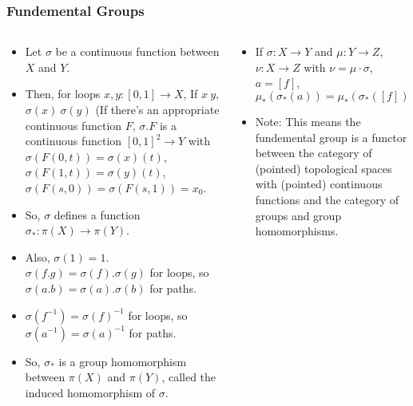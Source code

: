 \documentclass[8pt]{beamer}
\begin{document}
  \begin{frame}
    \frametitle{Fundemental Groups}
    \begin{columns}
      \begin{column}[T]{0.5\textwidth}
        \begin{itemize}
          \item Let $\sigma$ be a continuous function between $X$ and $Y$.
          \item Then, for loops $x,y : [0,1] \rightarrow X$,
            If $x ~ y$, $\sigma(x) ~ \sigma(y)$ (If there's an appropriate
            continuous function $F$, $\sigma . F$ is a continuous function
            $[0,1]^2 \rightarrow Y$ with $\sigma(F(0,t)) = \sigma(x)(t)$,
            $\sigma(F(1,t)) = \sigma(y)(t)$, $\sigma(F(s,0)) = \sigma(F(s,1)) =
            x_0$.
          \item So, $\sigma$ defines a function $\sigma_* : \pi(X) \rightarrow
            \pi(Y)$.
          \item Also, $\sigma(1) = 1$. $\sigma(f.g) = \sigma(f).\sigma(g)$ for
            loops, so $\sigma(a.b) = \sigma(a).\sigma(b)$ for paths.
          \item $\sigma(f^{-1}) = \sigma(f)^{-1}$ for loops, so
            $\sigma(a^{-1}) = \sigma(a)^{-1}$ for paths.
          \item So, $\sigma_*$ is a group homomorphism between $\pi(X)$ and
            $\pi(Y)$, called the induced homomorphism of $\sigma$.
        \end{itemize}

      \end{column}
      \begin{column}[T]{0.5\textwidth}
        \begin{itemize}
          \item If $\sigma : X \rightarrow Y$ and $\mu : Y \rightarrow Z$,
            $\nu : X \rightarrow Z$ with $\nu = \mu \cdot \sigma$, $a = [f]$,
            \[\mu_*(\sigma_*(a)) = \mu_*(\sigma_*([f])) = \mu_*([\sigma(f)])
                  = [\mu(\sigma(f))] = [\nu(f)] = \nu_*([f]) = \nu_*(a)\]
          \item Note: This means the fundemental group is a functor between the
            category of (pointed) topological spaces with (pointed) continuous
            functions and the category of groups and group homomorphisms.
        \end{itemize}
      \end{column}
    \end{columns}
  \end{frame}
\end{document}
